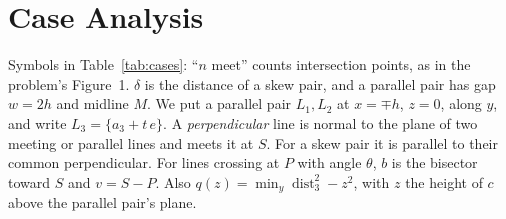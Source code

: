 \documentclass[10pt]{hackr26}
\newcommand{\dist}{\operatorname{dist}}
\begin{document}
\section{Case Analysis} \label{sec:cases}
Symbols in Table~\ref{tab:cases}: ``$n$ meet'' counts intersection points, as in the problem's Figure~1.
$\delta$ is the distance of a skew pair, and a parallel pair has gap $w=2h$ and midline $M$.
We put a parallel pair $L_1,L_2$ at $x=\mp h$, $z=0$, along $y$, and write $L_3=\{a_3+t\,e\}$.
A \emph{perpendicular} line is normal to the plane of two meeting or parallel lines and meets it at $S$.
For a skew pair it is parallel to their common perpendicular.
For lines crossing at $P$ with angle $\theta$, $b$ is the bisector toward $S$ and $v=S-P$.
Also $q(z)=\min_y\dist_3^2-z^2$, with $z$ the height of $c$ above the parallel pair's plane.
\end{document}
